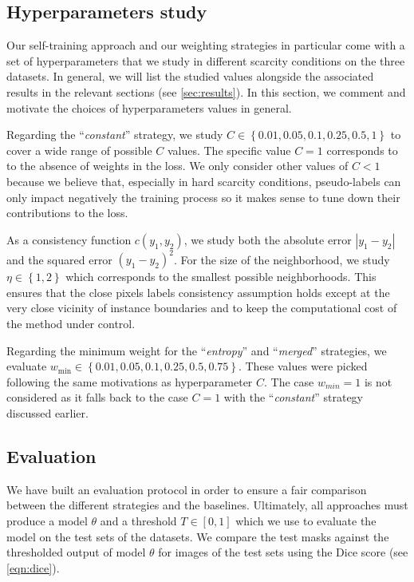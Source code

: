 \subsection{Hyperparameters study}

Our self-training approach and our weighting strategies in particular come with a set of hyperparameters that we study in different scarcity conditions on the three datasets. In general, we will list the studied values alongside the associated results in the relevant sections (see \cref{sec:results}). In this section, we comment and motivate the choices of hyperparameters values in general. 

Regarding the ``\textit{constant}'' strategy, we study $C \in \left\{0.01, 0.05, 0.1, 0.25, 0.5, 1\right\}$ to cover a wide range of possible $C$ values. The specific value $C = 1$ corresponds to to the absence of weights in the loss. We only consider other values of $C < 1$ because we believe that, especially in hard scarcity conditions, pseudo-labels can only impact negatively the training process so it makes sense to tune down their contributions to the loss. 

As a consistency function $c(y_1, y_2)$, we study both the absolute error $|y_1-y_2|$ and the squared error $(y_1-y_2)^2$. For the size of the neighborhood, we study $\eta \in \left\{1, 2\right\}$ which corresponds to the smallest possible neighborhoods. This ensures that the close pixels labels consistency assumption holds except at the very close vicinity of instance boundaries and to keep the computational cost of the method under control.

Regarding the minimum weight for the ``\textit{entropy}'' and ``\textit{merged}'' strategies, we evaluate $w_{\text{min}} \in \left\{0.01, 0.05, 0.1, 0.25, 0.5, 0.75\right\}$. These values were picked following the same motivations as hyperparameter $C$. The case $w_{min} = 1$ is not considered as it falls back to the case $C = 1$ with the ``\textit{constant}'' strategy discussed earlier.

\subsection{Evaluation}
\label{ssec:evaluation}

We have built an evaluation protocol in order to ensure a fair comparison between the different strategies and the baselines. Ultimately, all approaches must produce a model $\theta$ and a threshold $T \in [0, 1]$ which we use to evaluate the model on the test sets of the datasets. We compare the test masks against the thresholded output of model $\theta$ for images of the test sets using the Dice score (see \cref{eqn:dice}). 

